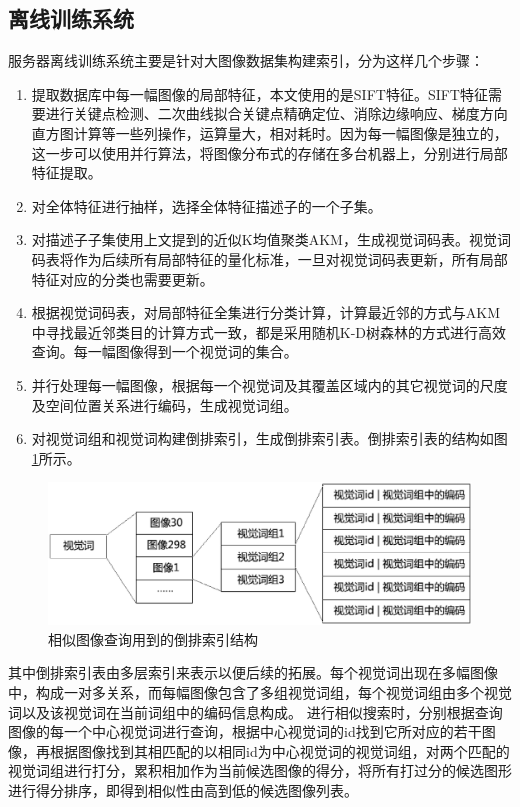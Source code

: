 \subsection{离线训练系统}
服务器离线训练系统主要是针对大图像数据集构建索引，分为这样几个步骤：
\begin{enumerate}
\item 提取数据库中每一幅图像的局部特征，本文使用的是SIFT特征。SIFT特征需要进行关键点检测、二次曲线拟合关键点精确定位、消除边缘响应、梯度方向直方图计算等一些列操作，运算量大，相对耗时。因为每一幅图像是独立的，这一步可以使用并行算法，将图像分布式的存储在多台机器上，分别进行局部特征提取。
\item 对全体特征进行抽样，选择全体特征描述子的一个子集。
\item 对描述子子集使用上文提到的近似K均值聚类AKM，生成视觉词码表。视觉词码表将作为后续所有局部特征的量化标准，一旦对视觉词码表更新，所有局部特征对应的分类也需要更新。
\item 根据视觉词码表，对局部特征全集进行分类计算，计算最近邻的方式与AKM中寻找最近邻类目的计算方式一致，都是采用随机K-D树森林的方式进行高效查询。每一幅图像得到一个视觉词的集合。
\item 并行处理每一幅图像，根据每一个视觉词及其覆盖区域内的其它视觉词的尺度及空间位置关系进行编码，生成视觉词组。
\item 对视觉词组和视觉词构建倒排索引，生成倒排索引表。倒排索引表的结构如图\ref{fig:inverted}所示。
\end{enumerate}
\begin{figure}
\centering\includegraphics[width=13cm]{imgs/ch4/inverted}
\caption{相似图像查询用到的倒排索引结构}
\label{fig:inverted}
\end{figure}
其中倒排索引表由多层索引来表示以便后续的拓展。每个视觉词出现在多幅图像中，构成一对多关系，而每幅图像包含了多组视觉词组，每个视觉词组由多个视觉词以及该视觉词在当前词组中的编码信息构成。
进行相似搜索时，分别根据查询图像的每一个中心视觉词进行查询，根据中心视觉词的id找到它所对应的若干图像，再根据图像找到其相匹配的以相同id为中心视觉词的视觉词组，对两个匹配的视觉词组进行打分，累积相加作为当前候选图像的得分，将所有打过分的候选图形进行得分排序，即得到相似性由高到低的候选图像列表。

